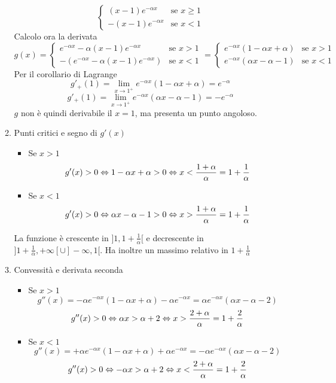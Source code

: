 \documentclass{article}
\begin{document}
\begin{enumerate}[label=\textbf{Esercizio 6.\arabic*.},itemindent=*]
\begin{enumerate}[label=\arabic*.,itemindent=*]
\[\begin{cases}
            (x-1)e^{-\alpha x}&\text{se } x\geq1\\
            -(x-1)e^{-\alpha x}&\text{se } x<1
        \end{cases}\]
        Calcolo ora la derivata
        \[g(x)=\begin{cases}
            e^{-\alpha x}-\alpha(x-1)e^{-\alpha x}&\text{se } x>1\\
            -(e^{-\alpha x}-\alpha(x-1)e^{-\alpha x})&\text{se } x<1
        \end{cases}=\begin{cases}
            e^{-\alpha x}(1-\alpha x+\alpha)&\text{se } x>1\\
            e^{-\alpha x}(\alpha x-\alpha-1)&\text{se } x<1
        \end{cases}\]
        Per il corollario di Lagrange
        \[g'_+(1)=\lim_{x\to 1^+}e^{-\alpha x}(1-\alpha x+\alpha)=e^{-\alpha}\]
        \[g'_+(1)=\lim_{x\to 1^+}e^{-\alpha x}(\alpha x-\alpha-1)=-e^{-\alpha}\]
        $g$ non è quindi derivabile il $x=1$, ma presenta un punto angoloso.
        \item Punti critici e segno di $g'(x)$
        \begin{itemize}
            \item Se $x>1$
            \[g'(x)>0\Leftrightarrow1-\alpha x+\alpha>0\Leftrightarrow x<\frac{1+\alpha}{\alpha}=1+\frac{1}{\alpha}\] 
            \item Se $x<1$
            \[g'(x)>0\Leftrightarrow\alpha x-\alpha-1>0\Leftrightarrow x>\frac{1+\alpha}{\alpha}=1+\frac{1}{\alpha}\] 
        \end{itemize}
        La funzione è crescente in $]1,1+\frac{1}{\alpha}[$ e decrescente in $]1+\frac{1}{\alpha}, +\infty[\cup]-\infty, 1[$. Ha inoltre un massimo relativo in $1+\frac{1}{\alpha}$
        \item Convessità e derivata seconda
        \begin{itemize}
            \item Se $x>1$
            \[g''(x)=-\alpha e^{-\alpha x}(1-\alpha x +\alpha)-\alpha e^{-\alpha x}=\alpha e^{-\alpha x}(\alpha x -\alpha -2)\]
            \[g''(x)>0\Leftrightarrow\alpha x > \alpha +2\Leftrightarrow x>\frac{2+\alpha}{\alpha}=1+\frac{2}{\alpha}\] 
            \item Se $x<1$
            \[g''(x)=+\alpha e^{-\alpha x}(1-\alpha x +\alpha)+\alpha e^{-\alpha x}=-\alpha e^{-\alpha x}(\alpha x -\alpha -2)\]
            \[g''(x)>0\Leftrightarrow-\alpha x > \alpha +2\Leftrightarrow x<\frac{2+\alpha}{\alpha}=1+\frac{2}{\alpha}\] 
        \end{itemize}

\end{enumerate}
\end{enumerate}
\end{document}
